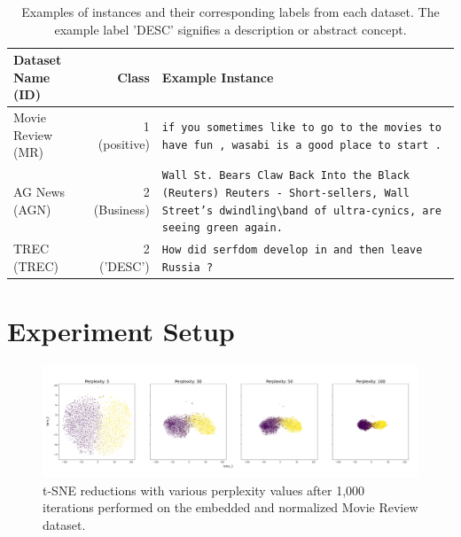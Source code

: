 \documentclass[english,bachelor,ul]{webisthesis} %
\begin{document}
\vspace{1\baselineskip}

\begin{table}[htbp]
    \centering
    \renewcommand{\arraystretch}{1.5}
    \begin{tabular}{@{}lrp{7cm}@{}} 
        \toprule
        \textbf{Dataset Name} \scriptsize (ID) & \textbf{Class} & \textbf{Example Instance} \\
        \midrule
        Movie Review \scriptsize (MR) & 1 (positive) & \texttt{if you sometimes like to go to the movies to have fun , wasabi is a good place to start .} \\
        AG News \scriptsize (AGN) & 2  (Business) & \texttt{Wall St. Bears Claw Back Into the Black (Reuters) Reuters - Short-sellers, Wall Street's dwindling\textbackslash band of ultra-cynics, are seeing green again.} \\
        TREC \scriptsize (TREC) & 2 ('DESC') & \texttt{How did serfdom develop in and then leave Russia ?} \\
        \bottomrule
    \end{tabular}
    \caption{Examples of instances and their corresponding labels from each dataset. The example label 'DESC' signifies a description or abstract concept.}
    \label{tab:dataset-instances}
\end{table}

\section{Experiment Setup}



\iffalse
\begin{figure}[htbp]
    \centering
    \includegraphics[width=1\textwidth]{img/reductions-mr-1000.jpg}
    \caption{t-SNE reductions with various perplexity values after 1,000 iterations performed on the embedded and normalized Movie Review dataset.}
    \label{fig:reductions-mr-1000}
\end{figure}
\end{document}
